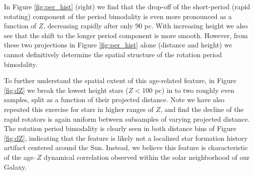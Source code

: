 \documentclass[trackchanges,preprint2]{aastex62}
\begin{document}
In Figure \ref{fig:per_hist} (right) we find that the drop-off of the short-period (rapid rotating) component of the period bimodality is even more pronounced as a function of $Z$, decreasing rapidly after only 90 pc. With increasing height we also see that the shift to the longer period component is more smooth. However, from these two projections in Figure \ref{fig:per_hist} alone (distance and height) we cannot definitively determine the spatial structure of the rotation period bimodality.


To further understand the spatial extent of this age-related feature, in Figure \ref{fig:dZ} we break the lowest height stars ($Z < 100$ pc) in to two roughly even samples, split as a function of their projected distance. Note we have also repeated this exercise for stars in higher ranges of $Z$, and find the decline of the rapid rotators is again uniform between subsamples of varying projected distance. The rotation period bimodality is clearly seen in both distance bins of Figure \ref{fig:dZ}, indicating that the feature is likely not a localized star formation history artifact centered around the Sun. Instead, we believe this feature is characteristic of the age--$Z$ dynamical correlation observed within the solar neighborhood of our Galaxy.  
\end{document}
